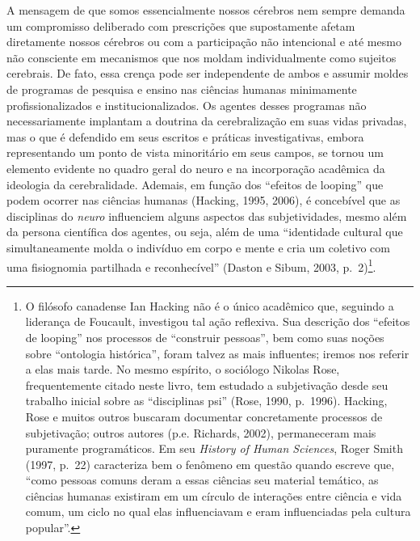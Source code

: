 A mensagem de que somos essencialmente nossos cérebros nem sempre
demanda um compromisso deliberado com prescrições que supostamente
afetam diretamente nossos cérebros ou com a participação não intencional
e até mesmo não consciente em mecanismos que nos moldam individualmente
como sujeitos cerebrais. De fato, essa crença pode ser independente de
ambos e assumir moldes de programas de pesquisa e ensino nas ciências
humanas minimamente profissionalizados e institucionalizados. Os agentes
desses programas não necessariamente implantam a doutrina da
cerebralização em suas vidas privadas, mas o que é defendido em seus
escritos e práticas investigativas, embora representando um ponto de
vista minoritário em seus campos, se tornou um elemento evidente no
quadro geral do neuro e na incorporação acadêmica da ideologia da
cerebralidade. Ademais, em função dos ``efeitos de looping'' que podem
ocorrer nas ciências humanas (Hacking, 1995, 2006), é concebível que as
disciplinas do \emph{neuro} influenciem alguns aspectos das
subjetividades, mesmo além da persona científica dos agentes, ou seja,
além de uma ``identidade cultural que simultaneamente molda o indivíduo
em corpo e mente e cria um coletivo com uma fisiognomia partilhada e
reconhecível'' (Daston e Sibum, 2003, p.~2)\footnote[1]{O filósofo canadense Ian Hacking não é o único acadêmico que,
seguindo a liderança de Foucault, investigou tal ação reflexiva. Sua
descrição dos ``efeitos de looping'' nos processos de ``construir
pessoas'', bem como suas noções sobre ``ontologia histórica'', foram
talvez as mais influentes; iremos nos referir a elas mais tarde. No
mesmo espírito, o sociólogo Nikolas Rose, frequentemente citado neste
livro, tem estudado a subjetivação desde seu trabalho inicial sobre as
``disciplinas psi'' (Rose, 1990, p.~1996). Hacking, Rose e muitos outros
buscaram documentar concretamente processos de subjetivação; outros
autores (p.e. Richards, 2002), permaneceram mais puramente
programáticos. Em seu \emph{History of Human Sciences}, Roger Smith
(1997, p.~22) caracteriza bem o fenômeno em questão quando escreve que,
``como pessoas comuns deram a essas ciências seu material temático, as
ciências humanas existiram em um círculo de interações entre ciência e
vida comum, um ciclo no qual elas influenciavam e eram influenciadas
pela cultura popular''.}.

